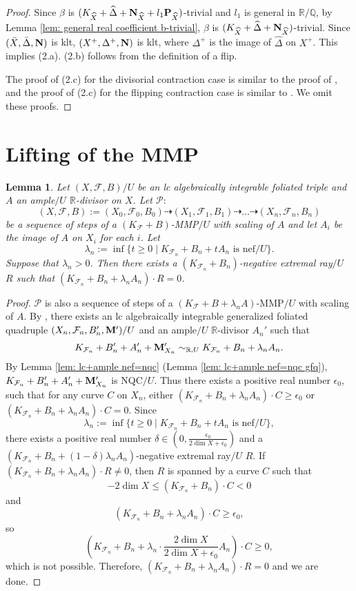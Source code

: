 \documentclass[11pt]{amsart}
\numberwithin{equation}{section}
\newcommand{\Mm}{{\bf{M}}}
\newcommand{\Nn}{{\bf{N}}}
\newcommand{\Pp}{{\bf{P}}}
\newcommand{\Rr}{\mathbb{R}}
\newcommand{\Ff}{\mathcal{F}}
\newtheorem{lem}[thm]{Lemma}
\theoremstyle{definition}
\theoremstyle{definition}
\theoremstyle{definition}
\begin{document}
\begin{proof}
Since $\beta$ is $(K_{\widehat X}+\widehat\Delta+\Nn_{\widehat X}+l_1\Pp_{\widehat X})$-trivial and $l_1$ is general in $\mathbb R/\mathbb Q$, by Lemma \ref{lem: general real coefficient b-trivial}, $\beta$ is $(K_{\widehat X}+\widehat\Delta+\Nn_{\widehat X})$-trivial. Since $(\bar X,\bar\Delta,\Nn)$ is klt, $(X^+,\Delta^+,\Nn)$ is klt, where $\Delta^+$ is the image of $\widehat\Delta$ on $X^+$. This implies (2.a). (2.b) follows from the definition of a flip.

The proof of (2.c) for the divisorial contraction case is similar to the proof of \cite[Corollary 3.17]{KM98}, and the proof of (2.c) for the flipping contraction case is similar to \cite[Theorem 6.1, Step 3]{HL23}. We omit these proofs.
\end{proof}

\section{Lifting of the MMP}\label{sec: lifting}

\begin{lem}\label{lem: can run mmp scaling}
        Let $(X,\Ff,B)/U$ be an lc algebraically integrable foliated triple and $A$ an ample$/U$ $\Rr$-divisor on $X$. Let $\mathcal{P}:$
    $$(X,\Ff,B):=(X_0,\Ff_0,B_0)\dashrightarrow (X_1,\Ff_1,B_1)\dashrightarrow\dots\dashrightarrow (X_n,\Ff_n,B_n)$$
    be a sequence of steps of a $(K_{\Ff}+B)$-MMP$/U$ with scaling of $A$ and let $A_i$ be the image of $A$ on $X_i$ for each $i$. Let
    $$\lambda_n:=\inf\{t\geq 0\mid K_{\Ff_n}+B_n+tA_n\text{ is nef}/U\}.$$
    Suppose that $\lambda_n>0$. Then there exists a $(K_{\Ff_n}+B_n)$-negative extremal ray$/U$ $R$ such that $(K_{\Ff_n}+B_n+\lambda_nA_n)\cdot R=0$.
\end{lem}
\begin{proof}
    $\mathcal{P}$ is also a sequence of steps of a $(K_{\Ff}+B+\lambda_nA)$-MMP$/U$ with scaling of $A$. By \cite[Lemma 16.1.1]{CHLX23}, there exists an lc algebraically integrable generalized foliated quadruple $(X_n,\Ff_n,B_n',\Mm')/U$ and an ample$/U$ $\Rr$-divisor $A_n'$ such that $$K_{\Ff_n}+B_n'+A_n'+\Mm'_{X_n}\sim_{\mathbb R,U}K_{\Ff_n}+B_n+\lambda_nA_n.$$
    By Lemma \ref{lem: lc+ample nef=nqc} (Lemma \ref{lem: lc+ample nef=nqc gfq}), $K_{\Ff_n}+B_n'+A_n'+\Mm'_{X_n}$ is NQC$/U$. Thus there exists a positive real number $\epsilon_0$, such that for any curve $C$ on $X_n$, either $(K_{\Ff_n}+B_n+\lambda_nA_n)\cdot C\geq\epsilon_0$ or $(K_{\Ff_n}+B_n+\lambda_nA_n)\cdot C=0$. Since 
        $$\lambda_n:=\inf\{t\geq 0\mid K_{\Ff_n}+B_n+tA_n\text{ is nef}/U\},$$
        there exists a positive real number $\delta\in\left(0,\frac{\epsilon_0}{2\dim X+\epsilon_0}\right)$ and a 
        $(K_{\Ff_n}+B_n+(1-\delta)\lambda_nA_n)$-negative extremal ray$/U$ $R$. If $(K_{\Ff_n}+B_n+\lambda_nA_n)\cdot R\not=0$, then $R$ is spanned by a curve $C$ such that $$-2\dim X\leq (K_{\Ff_n}+B_n)\cdot C<0$$
    and $$(K_{\Ff_n}+B_n+\lambda_nA_n)\cdot C\geq\epsilon_0,$$ 
    so 
    $$\left(K_{\Ff_n}+B_n+\lambda_n\cdot\frac{2\dim X}{2\dim X+\epsilon_0}A_n\right)\cdot C\geq 0,$$
    which is not possible. Therefore, $(K_{\Ff_n}+B_n+\lambda_nA_n)\cdot R=0$ and we are done.
\end{proof}
\end{document}
